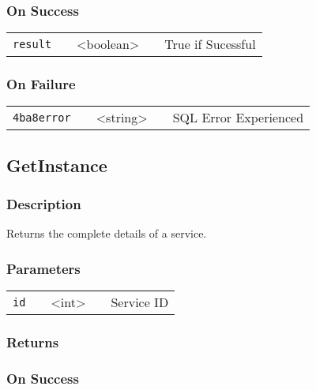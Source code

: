 \documentclass[a4paper,12pt]{article}
\begin{document}
\subsubsection{On Success}

\begin{tabular}{ccccc}
\verb!result! & \vspace{15mm} & <boolean> & \vspace{15mm} & True if Sucessful \\
\end{tabular}

\subsubsection{On Failure}

\begin{tabular}{ccccc}
\verb!4ba8error! & \vspace{15mm} & <string> & \vspace{15mm} & SQL Error Experienced \\
\end{tabular}

\subsection{GetInstance}

\subsubsection{Description}

Returns the complete details of a service.

\subsubsection{Parameters}

\begin{tabular}{ccccc}
\verb!id! & \vspace{15mm} & <int> & \vspace{15mm} & Service ID \\
\end{tabular}

\subsubsection{Returns}

\subsubsection{On Success}
\end{document}
